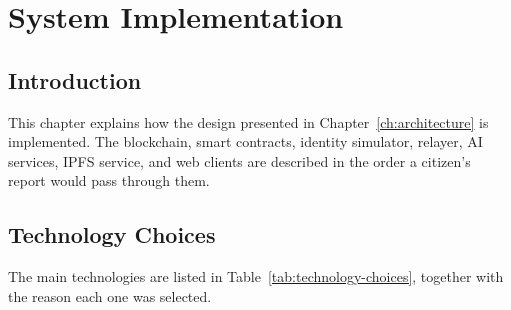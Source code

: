 \chapter{System Implementation}
\label{ch:implementation}

\section{Introduction}
\label{sec:implementation-introduction}

This chapter explains how the design presented in Chapter~\ref{ch:architecture} is implemented. The blockchain, smart contracts, identity simulator, relayer, AI services, IPFS service, and web clients are described in the order a citizen's report would pass through them.

\section{Technology Choices}
\label{sec:technology-choices}

The main technologies are listed in Table~\ref{tab:technology-choices}, together with the reason each one was selected. 

